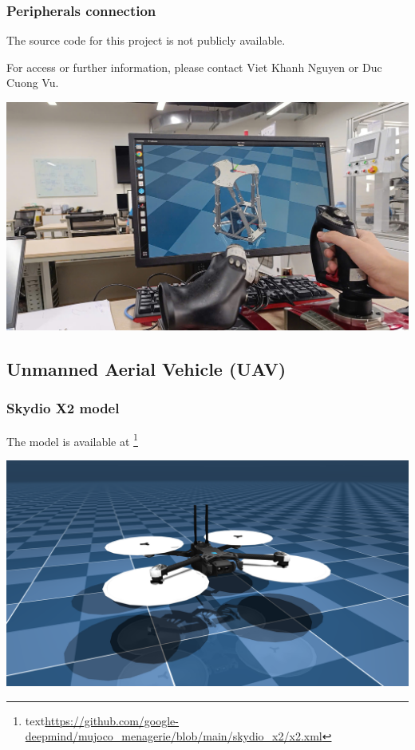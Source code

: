 \documentclass[9pt]{beamer}
\begin{document}
					\begin{frame}[fragile]
			\frametitle{Peripherals connection}
			The source code for this project is not publicly available.
			
			For access or further information, please contact Viet Khanh Nguyen or Duc Cuong Vu.
				\begin{center}
					\includegraphics[width=1\linewidth]{images/real-joystick-ctrl}
				\end{center}
				
			\end{frame}
		
		\subsection{Unmanned Aerial Vehicle (UAV)}
			\begin{frame}[fragile]
				\frametitle{Skydio X2 model}
				The model is available at \footnote{text\href{https://github.com/google-deepmind/mujoco_menagerie/blob/main/skydio_x2/x2.xml}{https://github.com/google-deepmind/mujoco\_menagerie/blob/main/skydio\_x2/x2.xml}}
				\begin{center}
					\includegraphics[width=1\linewidth]{images/mjc-x2}
				\end{center}
				
			\end{frame}
		
\end{document}

